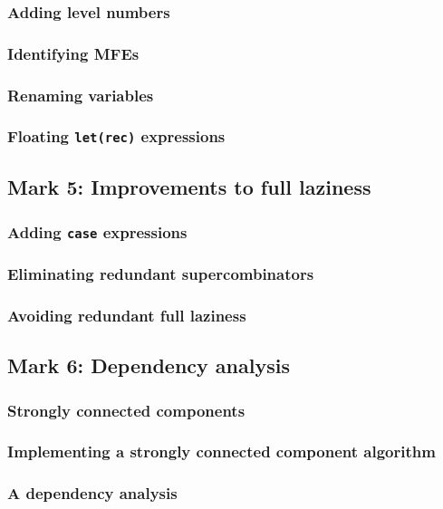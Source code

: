 \documentclass{jarticle}
\begin{document}
\subsubsection{Adding level numbers}
\subsubsection{Identifying MFEs}
\subsubsection{Renaming variables}
\subsubsection{Floating \texttt{let(rec)} expressions}
\newpage

\subsection{Mark 5: Improvements to full laziness}
\subsubsection{Adding \texttt{case} expressions}
\subsubsection{Eliminating redundant supercombinators}
\subsubsection{Avoiding redundant full laziness}
\newpage

\subsection{Mark 6: Dependency analysis \dag}
\subsubsection{Strongly connected components}
\subsubsection{Implementing a strongly connected component algorithm}
\subsubsection{A dependency analysis}
\newpage
\end{document}
